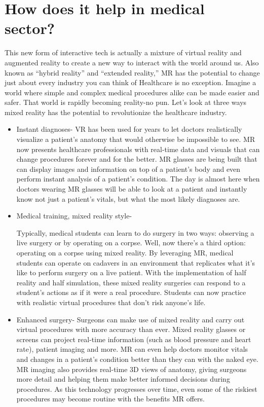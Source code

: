 \documentclass[11pt]{article}
\begin{document}
\section{\textbf{How does it help in medical sector?}}
This new form of interactive tech is actually a mixture of virtual reality and augmented reality to create a new way to interact with the world around us. Also known as “hybrid reality” and “extended reality,” MR has the potential to change just about every industry you can think of Healthcare is no exception. Imagine a world where simple and complex medical procedures alike can be made easier and safer. That world is rapidly becoming reality-no pun. Let’s look at three ways mixed reality has the potential to revolutionize the healthcare industry.
\begin{itemize}




\item \large Instant diagnoses-
VR has been used for years to let doctors realistically visualize a patient’s anatomy that would otherwise be impossible to see. MR now presents healthcare professionals with real-time data and visuals that can change procedures forever and for the better. MR glasses are being built that can display images and information on top of a patient’s body and even perform instant analysis of a patient’s condition. The day is almost here when doctors wearing MR glasses will be able to look at a patient and instantly know not just a patient’s vitals, but what the most likely diagnoses are. 
\item \large Medical training, mixed reality style-

Typically, medical students can learn to do surgery in two ways: observing a live surgery or by operating on a corpse. Well, now there’s a third option: operating on a corpse using mixed reality. By leveraging MR, medical students can operate on cadavers in an environment that replicates what it’s like to perform surgery on a live patient. With the implementation of half reality and half simulation, these mixed reality surgeries can respond to a student’s actions as if it were a real procedure. Students can now practice with realistic virtual procedures that don’t risk anyone’s life.

\item \large Enhanced surgery-
Surgeons can make use of mixed reality and carry out virtual procedures with more accuracy than ever. Mixed reality glasses or screens can project real-time information (such as blood pressure and heart rate), patient imaging and more. MR can even help doctors monitor vitals and changes in a patient’s condition better than they can with the naked eye. MR imaging also provides real-time 3D views of anatomy, giving surgeons more detail and helping them make better informed decisions during procedures. As this technology progresses over time, even some of the riskiest procedures may become routine with the benefits MR offers. 



\end{itemize}
\end{document}

